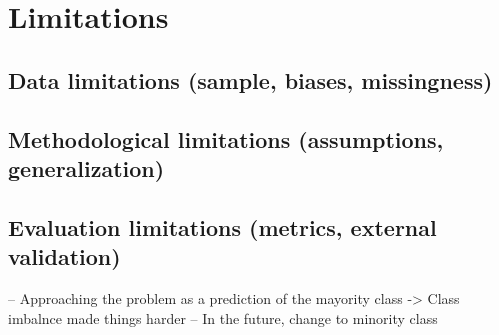 \chapter{Limitations}\label{chap:limitations}

\section{Data limitations (sample, biases, missingness)}\label{sec:limitations-data}

\section{Methodological limitations (assumptions, generalization)}\label{sec:limitations-methods}

\section{Evaluation limitations (metrics, external validation)}\label{sec:limitations-evaluation}
-- Approaching the problem as a prediction of the mayority class -> Class imbalnce made things harder
    -- In the future, change to minority class
